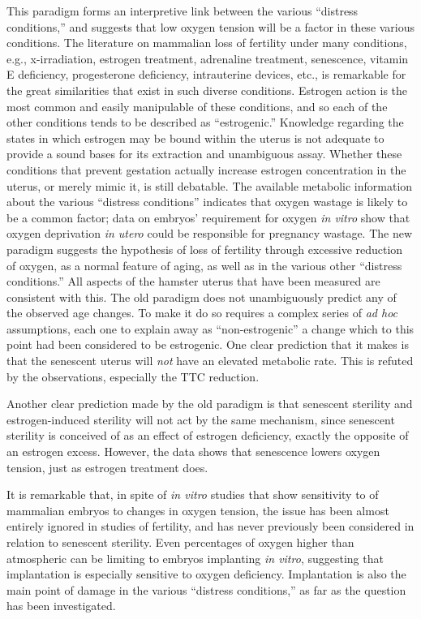 This paradigm forms an interpretive link between the various ``distress conditions,'' and suggests that low oxygen tension will be a factor in these various conditions. The literature on mammalian loss of fertility under many conditions, e.g., x-irradiation, estrogen treatment, adrenaline treatment, senescence, vitamin E deficiency, progesterone deficiency, intrauterine devices, etc., is remarkable for the great similarities that exist in such diverse conditions. Estrogen action is the most common and easily manipulable of these conditions, and so each of the other conditions tends to be described as ``estrogenic.'' Knowledge regarding the states in which estrogen may be bound within the uterus is not adequate to provide a sound bases for its extraction and unambiguous assay. Whether these conditions that prevent gestation actually increase estrogen concentration in the uterus, or merely mimic it, is still debatable. The available metabolic information about the various ``distress conditions'' indicates that oxygen wastage is likely to be a common factor; data on embryos' requirement for oxygen \textit{in vitro} show that oxygen deprivation \textit{in utero} could be responsible for pregnancy wastage. The new paradigm suggests the hypothesis of loss of fertility through excessive reduction of oxygen, as a normal feature of aging, as well as in the various other ``distress conditions.'' All aspects of the hamster uterus that have been measured are consistent with this. The old paradigm does not unambiguously predict any of the observed age changes. To make it do so requires a complex series of \textit{ad hoc} assumptions, each one to explain away as ``non-estrogenic'' a change which to this point had been considered to be estrogenic. One clear prediction that it makes is that the senescent uterus will \textit{not} have an elevated metabolic rate. This is refuted by the observations, especially the TTC reduction.

Another clear prediction made by the old paradigm is that senescent sterility and estrogen-induced sterility will not act by the same mechanism, since senescent sterility is conceived of as an effect of estrogen deficiency, exactly the opposite of an estrogen excess. However, the data shows that senescence lowers oxygen tension, just as estrogen treatment does.

It is remarkable that, in spite of \textit{in vitro} studies that show sensitivity to of mammalian embryos to changes in oxygen tension, the issue has been almost entirely ignored in studies of fertility, and has never previously been considered in relation to senescent sterility. Even percentages of oxygen higher than atmospheric can be limiting to embryos implanting \textit{in vitro}, suggesting that implantation is especially sensitive to oxygen deficiency. Implantation is also the main point of damage in the various ``distress conditions,'' as far as the question has been investigated.

